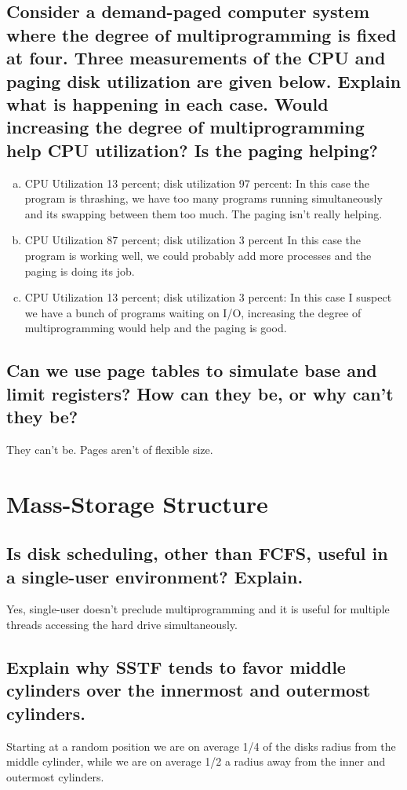 \documentclass{book}%
\begin{document}
\section{Consider a demand-paged computer system where the degree of multiprogramming is fixed at four. Three measurements of the CPU and paging disk utilization are given below. Explain what is happening in each case. Would increasing the degree of multiprogramming help CPU utilization? Is the paging helping?}
\begin{enumerate}[a.]
\item CPU Utilization 13 percent; disk utilization 97 percent: In this case the program is thrashing, we have too many programs running simultaneously and its swapping between them too much. The paging isn't really helping.
\item CPU Utilization 87 percent; disk utilization 3 percent In this case the program is working well, we could probably add more processes and the paging is doing its job.
\item CPU Utilization 13 percent; disk utilization 3 percent: In this case I suspect we have a bunch of programs waiting on I/O, increasing the degree of multiprogramming would help and the paging is good.
\end{enumerate}
\section{Can we use page tables to simulate base and limit registers? How can they be, or why can't they be?}
They can't be. Pages aren't of flexible size.
\chapter{Mass-Storage Structure}
\section{Is disk scheduling, other than FCFS, useful in a single-user environment? Explain.}
Yes, single-user doesn't preclude multiprogramming and it is useful for multiple threads accessing the hard drive simultaneously.
\section{Explain why SSTF tends to favor middle cylinders over the innermost and outermost cylinders.}
Starting at a random position we are on average 1/4 of the disks radius from the middle cylinder, while we are on average 1/2 a radius away from the inner and outermost cylinders.
\end{document}
